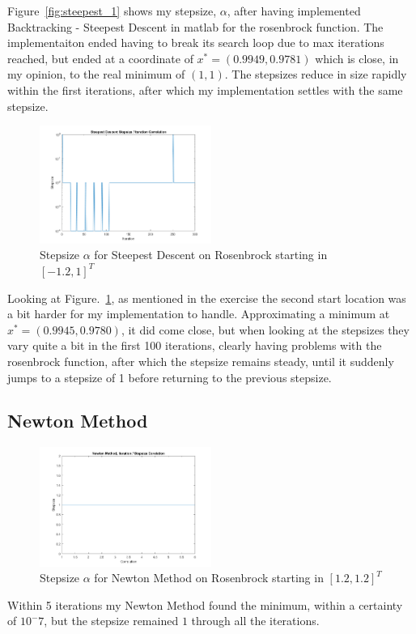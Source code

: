 \documentclass[11pt]{article} %
\begin{document}
Figure~\ref{fig:steepest_1} shows my stepsize, $\alpha$, after having implemented Backtracking - Steepest Descent in matlab for the rosenbrock function. The implementaiton ended having to break its search loop due to max iterations reached, but ended at a coordinate of $x^*=(0.9949, 0.9781)$ which is close, in my opinion, to the real minimum of $(1,1)$. The stepsizes reduce in size rapidly within the first iterations, after which my implementation settles with the same stepsize.

\begin{figure}[H]
    \centering
    \includegraphics[width=0.5\textwidth]{steepest_descentfig_2}
    \caption{Stepsize $\alpha$ for Steepest Descent on Rosenbrock starting in $[-1.2, 1]^T$}
    \label{fig:steepest_2}
\end{figure}
Looking at Figure.~\ref{fig:steepest_2}, as mentioned in the exercise the second start location was a bit harder for my implementation to handle.
Approximating a minimum at $x^* = (0.9945, 0.9780)$, it did come close, but when looking at the stepsizes they vary quite a bit in the first 100 iterations, clearly having problems with the rosenbrock function, after which the stepsize remains steady, until it suddenly jumps to a stepsize of 1 before returning to the previous stepsize.

\subsection*{Newton Method}
\begin{figure}[H]
    \centering
    \includegraphics[width=0.5\textwidth]{newton_1}
    \caption{Stepsize $\alpha$ for Newton Method on Rosenbrock starting in $[1.2, 1.2]^T$}
    \label{fig:newton_1}
\end{figure}
Within 5 iterations my Newton Method found the minimum, within a certainty of $10^-7$, but the stepsize remained $1$ through all the iterations.
\end{document}
